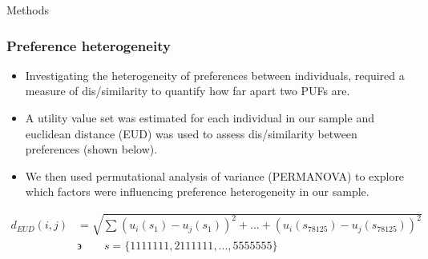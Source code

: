 \documentclass[t,compress,9pt,aspectratio=169]{beamer}
\begin{document}
\begin{frame}{Methods}
    \frametitle{Preference heterogeneity}
    \begin{itemize}
        \item Investigating the heterogeneity of preferences between individuals, required a measure of dis/similarity to quantify how far apart two PUFs are.
        \item A utility value set was estimated for each individual in our sample and euclidean distance (EUD) was used to assess dis/similarity between preferences (shown below).
        \item We then used permutational analysis of variance (PERMANOVA) to explore which factors were influencing preference heterogeneity in our sample.
    \end{itemize}
    
\begin{equation} \label{eq:EUD}
  \begin{aligned}
    d_{EUD}(i,j) & =\sqrt{\sum_{}^{}(u_{i}(s_{1})-u_{j}(s_{1}))^{2}+ ... +(u_{i}(s_{78125})-u_{j}(s_{78125}))^{2}}\\
      & \backepsilon \quad \quad s = \{1111111, 2111111, ..., 5555555\}\\
  \end{aligned}
\end{equation}
\end{frame}
\end{document}
